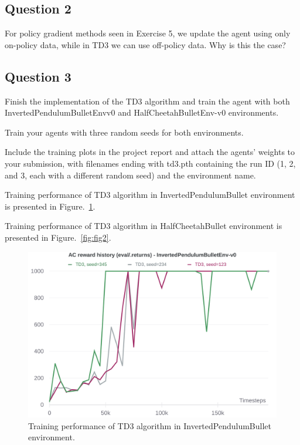 \documentclass[12pt]{article}
\begin{document}
\subsection*{Question 2}

For policy gradient methods seen in Exercise 5, we update the agent using only on-policy data,
while in TD3 we can use off-policy data. Why is this the case?

\pagebreak

\subsection*{Question 3}

Finish the implementation of the TD3 algorithm and train the agent with both InvertedPendulumBulletEnvv0 and HalfCheetahBulletEnv-v0 environments.
\newline

\noindent
Train your agents with three random seeds for both environments. 
\newline

\noindent
Include the training plots in the project report and attach the agents’ weights to your submission, with filenames ending with td3.pth containing the run ID
(1, 2, and 3, each with a different random seed) and the environment name.
\newline

\noindent
Training performance of TD3 algorithm in InvertedPendulumBullet environment is presented in Figure.~\ref*{fig:fig1}.
\newline

Training performance of TD3 algorithm in HalfCheetahBullet environment is presented in Figure.~\ref*{fig:fig2}.
\newline

\pagebreak

\begin{figure}[pht] 
	\centering  %
    \includegraphics[width=0.65\columnwidth]{img/Figure_1_WB_InvertedPendulumBullet_TD3.png}
	\caption{Training performance of TD3 algorithm in InvertedPendulumBullet environment.}
	\label{fig:fig1}
\end{figure}
\end{document}
